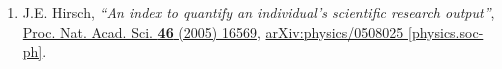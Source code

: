 
\begin{enumerate}
 \item J.E. Hirsch,
  \textit{``An index to quantify an individual's scientific research output''},
  \href{https://dx.doi.org/10.1073/pnas.0507655102}
   {Proc. Nat. Acad. Sci. \textbf{46} (2005) 16569},
  \href{https://arxiv.org/abs/physics/0508025}{arXiv:physics/0508025 [physics.soc-ph]}.
\end{enumerate}
